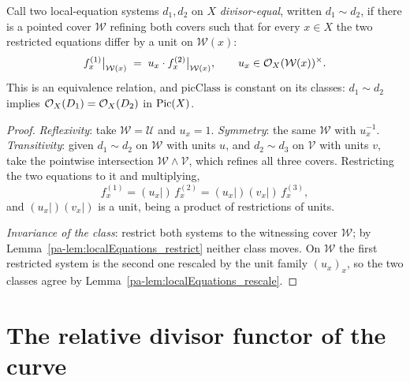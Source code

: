 \begin{lemma}
  \label{pa-lem:localEquations_divEq}
  \leanok

  Call two local-equation systems \(d_1, d_2\) on \(X\) \emph{divisor-equal}, written
  \(d_1 \sim d_2\), if there is a pointed cover \(\mathcal W\) refining both covers such
  that for every \(x \in X\) the two restricted equations differ by a unit on
  \(\mathcal W(x)\):
  \[
    f^{(1)}_x\big|_{\mathcal W(x)} \;=\; u_x \cdot f^{(2)}_x\big|_{\mathcal W(x)},
    \qquad u_x \in \mathcal{O}_{X}(\mathcal W(x))^{\times}.
  \]
  This is an equivalence relation, and \(\mathrm{picClass}\) is constant on its classes:
  \(d_1 \sim d_2\) implies \(\mathcal{O}_{X}(D_1) = \mathcal{O}_{X}(D_2)\) in \(\operatorname{Pic}(X)\).
\end{lemma}
\begin{proof}
  \leanok
  \emph{Reflexivity}: take \(\mathcal W = \mathcal U\) and \(u_x = 1\).
  \emph{Symmetry}: the same \(\mathcal W\) with \(u_x^{-1}\).
  \emph{Transitivity}: given \(d_1 \sim d_2\) on \(\mathcal W\) with units \(u\), and
  \(d_2 \sim d_3\) on \(\mathcal V\) with units \(v\), take the pointwise intersection
  \(\mathcal W \wedge \mathcal V\), which refines all three covers. Restricting the two
  equations to it and multiplying,
  \[
    f^{(1)}_x = (u_x|)\,f^{(2)}_x = (u_x|)(v_x|)\, f^{(3)}_x ,
  \]
  and \((u_x|)(v_x|)\) is a unit, being a product of restrictions of units.

  \emph{Invariance of the class}: restrict both systems to the witnessing cover
  \(\mathcal W\); by Lemma~\ref{pa-lem:localEquations_restrict} neither class moves. On
  \(\mathcal W\) the first restricted system is the second one rescaled by the unit family
  \((u_x)_x\), so the two classes agree by Lemma~\ref{pa-lem:localEquations_rescale}.
\end{proof}

\section{The relative divisor functor of the curve}
\label{pa-sec:divfam}

